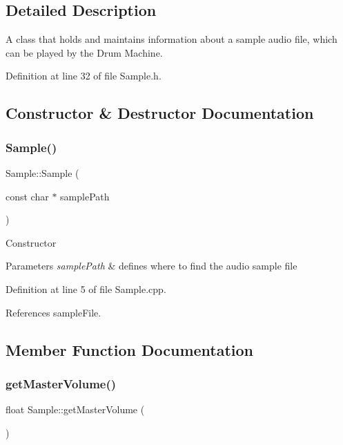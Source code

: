 \subsection{Detailed Description}
A class that holds and maintains information about a sample audio file, which can be played by the Drum Machine. 

Definition at line 32 of file Sample.\+h.



\subsection{Constructor \& Destructor Documentation}
\mbox{\label{class_sample_a7aea6b090998a430341aa6d1d6222c63}} 
\subsubsection{\texorpdfstring{Sample()}{Sample()}}
{\footnotesize\ttfamily Sample\+::\+Sample (\begin{DoxyParamCaption}\item[{const char $\ast$}]{sample\+Path }\end{DoxyParamCaption})\hspace{0.3cm}{\ttfamily [explicit]}}

Constructor 
\begin{DoxyParams}{Parameters}
{\em sample\+Path} & defines where to find the audio sample file \\
\hline
\end{DoxyParams}


Definition at line 5 of file Sample.\+cpp.



References sample\+File.



\subsection{Member Function Documentation}
\mbox{\label{class_sample_afceddb412ab50a67cb98ca6b72456f24}} 
\subsubsection{\texorpdfstring{get\+Master\+Volume()}{getMasterVolume()}}
{\footnotesize\ttfamily float Sample\+::get\+Master\+Volume (\begin{DoxyParamCaption}{ }\end{DoxyParamCaption})\hspace{0.3cm}{\ttfamily [private]}}



